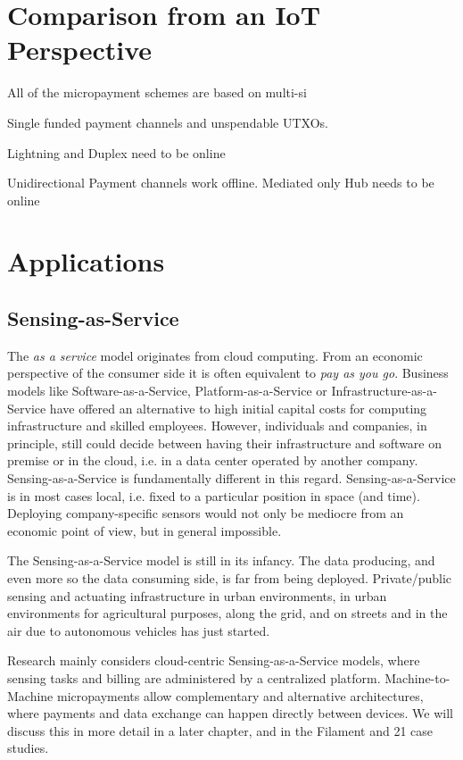 \section{Comparison from an IoT Perspective}

All of the micropayment schemes are based on multi-si

Single funded payment channels and unspendable UTXOs.

Lightning and Duplex need to be online 

Unidirectional Payment channels work offline. Mediated only Hub needs to be online 

\section{Applications}

\subsection{Sensing-as-Service}

The \emph{as a service} model originates from cloud computing. From an economic perspective of the consumer side it is often equivalent to \emph{pay as you go}. Business models like Software-as-a-Service, Platform-as-a-Service or Infrastructure-as-a-Service have offered an alternative to high initial capital costs for computing infrastructure and skilled employees. However, individuals and companies, in principle, still could decide between having their infrastructure and software on premise or in the cloud, i.e. in a data center operated by another company. Sensing-as-a-Service is fundamentally different in this regard. Sensing-as-a-Service is in most cases local, i.e. fixed to a particular position in space (and time). Deploying company-specific sensors would not only be mediocre from an economic point of view, but in general impossible. 

The Sensing-as-a-Service model is still in its infancy. The data producing, and even more so the data consuming side, is far from being deployed. Private/public sensing and actuating infrastructure in urban environments, in urban environments for agricultural purposes, along the grid, and on streets and in the air due to autonomous vehicles has just started.

Research mainly considers cloud-centric Sensing-as-a-Service models, where sensing tasks and billing are administered by a centralized platform. Machine-to-Machine micropayments allow complementary and alternative architectures, where payments and data exchange can happen directly between devices. We will discuss this in more detail in a later chapter, and in the Filament and 21 case studies.


